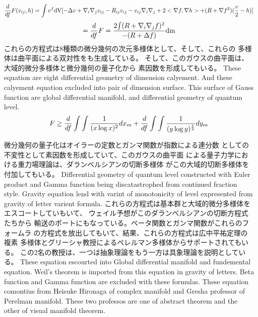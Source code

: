 \documentclass{jsarticle}
\begin{document}
  $$ {d \over d f}F(v_{ij},h) = \int {e^{f}\mathrm{dV}}
  [- \Delta v + \nabla_{i}\nabla_{j}
  v_{ij} - R_{ij}v_{ij} - v_{ij}\nabla_{i}\nabla_{j} + 2 <\nabla f,\nabla h>
  + (R + \nabla f^2)({v \over 2} - h)]$$
  $$ = {d \over d f}F = {2 {\int (R + \nabla_{i}\nabla_{j} f)^2} \over 
  { - (R + \Delta f)}}\mathrm{dm} $$
  これらの方程式は8種類の微分幾何の次元多様体として、そして、これらの
  多様体は曲平面による双対性をも生成している。 
  そして、このガウスの曲平面は、大域的微分多様体と微分幾何の量子化から
  素因数を形成してもいる。
  These equation are eight differential geometry of dimension calyement.
  And these calyement equation excluded into pair of dimension surface.
  This surface of Gauss function are global differential manifold,
  and differential geometry of quantum level.
  $$ F \ge {d \over d f}\int \int{1 \over (x \log x)^2}dx_m 
  + {d \over d f}\int \int{1 \over (y \log y)^{1 \over 2}}dy_m $$

  微分幾何の量子化はオイラーの定数とガンマ関数が指数による連分数
  としての不変性として素因数を形成していて、このガウスの曲平面
  による量子力学における重力場理論は、ダランベルシアンの切断多様体
  がこの大域的切断多様体を付加してもいる。
  Differential geometry of quantum level constructed with Euler product
  and Gamma function being discatastrophed from continued fraction style.
  Gravity equation lend with varint of monotonicity of level expresented
  from gravity of letter varient formula.
  これらの方程式は基本群と大域的微分多様体をエスコートしていもいて、
  ウェイル予想がこのダランベルシアンの切断方程式たちから
  輸送のポートにもなっている。ベータ関数とガンマ関数がこれらのフォームラ
  の方程式を放出してもいて、結果、これらの方程式は広中平祐定理の複素
  多様体とグリーシャ教授によるペレルマン多様体からサポートされてもいる。
  この2名の教授は、一つは抽象理論をもう一方は具象理論を説明としている。
  These equation escourted into Global differential manifold and
  fundemental equation.
  Weil's theorem is imported from this equation in gravity of letters.
  Beta function and Gamma function are excluded with these formulas.
  These equation comontius from Heisuke Hironaga of complex manifold
  and Gresha professor of Perelman manifold.
  These two professos are one of abstract theorem and the other of
  visual manifold theorem.
\end{document}
